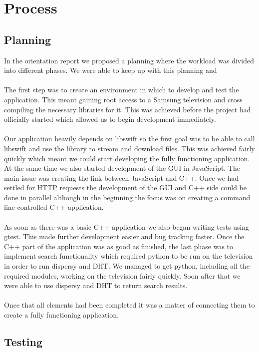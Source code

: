 \chapter{Process}

\section{Planning}

In the orientation report we proposed a planning where the workload was divided into different phases. We were able to keep up with this planning and 
\\\\
The first step was to create an environment in which to develop and test the application. This meant gaining root access to a Samsung television and cross compiling the necessary libraries for it. This was achieved before the project had officially started which allowed us to begin development immediately.
\\\\
Our application heavily depends on libswift so the first goal was to be able to call libswift and use the library to stream and download files. This was achieved fairly quickly which meant we could start developing the fully functioning application. At the same time we also started development of the GUI in JavaScript. The main issue was creating the link between JavaScript and C++. Once we had settled for HTTP requests the development of the GUI and C++ side could be done in parallel although in the beginning the focus was on creating a command line controlled C++ application.
\\\\
As soon as there was a basic C++ application we also began writing tests using gtest. This made further development easier and bug tracking faster. Once the C++ part of the application was as good as finished, the last phase was to implement search functionality which required python to be run on the television in order to run dispersy and DHT. We managed to get python, including all the required modules, working on the television fairly quickly. Soon after that we were able to use dispersy and DHT to return search results.
\\\\
Once that all elements had been completed it was a matter of connecting them to create a fully functioning application.

\section{Testing}

